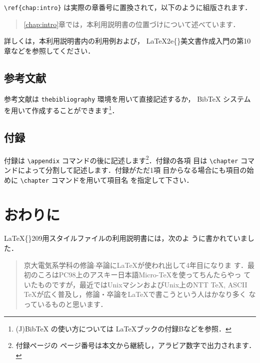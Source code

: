 \documentclass[
  sotsuron]{kuee}
\begin{document}
\verb+\ref{chap:intro}+
は実際の章番号に置換されて，以下のように組版されます．

\begin{quote}
  \ref{chap:intro}章では，本利用説明書の位置づけについて述べています．
\end{quote}

詳しくは，本利用説明書内の利用例および，
\LaTeX2e\{\}美文書作成入門\cite{GuideBook}の第10章などを参照してください．

\hypertarget{ux53c2ux8003ux6587ux732e}{%
\section{参考文献}\label{ux53c2ux8003ux6587ux732e}}

参考文献は \verb+thebibliography+ 環境を用いて直接記述するか， BibTeX
システムを用いて作成することができます\footnote{(J)BibTeX
  の使い方については \LaTeX ブック\cite{LaTeX}の付録Bなどを参照．}．

\hypertarget{ux4ed8ux9332}{%
\section{付録}\label{ux4ed8ux9332}}

付録は \verb+\appendix+ コマンドの後に記述します\footnote{付録ページの
  ページ番号は本文から継続し，アラビア数字で出力されます．}．付録の各項
目は \verb+\chapter+ コマンドによって分割して記述します．付録がただ1項
目からなる場合にも項目の始めに \verb+\chapter+ コマンドを用いて項目名
を指定して下さい．

\hypertarget{ux304aux308fux308aux306b}{%
\chapter{おわりに}\label{ux304aux308fux308aux306b}}

\label{chap:conclusion}

\LaTeX\{\}209用スタイルファイルの利用説明書\cite{OldTebiki}には，次のよ
うに書かれていました．

\begin{quote}
  京大電気系学科の修論$\cdot$卒論に\LaTeX が使われ出して4年目になりま
  す．最初のころはPC98上のアスキー日本語Micro-\TeX を使ってちんたらやっ
  ていたものですが，最近ではUnixマシンおよびUnix上のNTT \TeX, ASCII
  \TeX が広く普及し，修論・卒論を\LaTeX で書こうという人はかなり多く
  なっているものと思います．
\end{quote}
\end{document}
